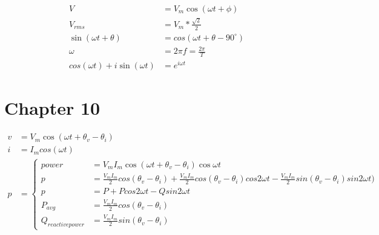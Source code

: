 \documentclass[a4paper,12]{article}
\begin{document}
\begin{align}
    V &=V_m\cos(\omega t+\phi)\\
    V_{rms} &=V_m*\frac{\sqrt{2}}{2}\\
    \sin(\omega t +\theta)&=cos(\omega t+\theta-90^\circ)\\
    \omega &= 2\pi f=\frac{2\pi}{T}\\
    cos(\omega t)+i \sin(\omega t) &=e^{i\omega t}
\end{align}

\cleardoublepage

\section{Chapter 10}
\begin{align*}
    v &=V_m \cos(\omega t +\theta_v-\theta _i)\\
    i &=I_m cos(\omega t)\\
    p &=\begin{cases}
     power &=V_mI_m \cos(\omega t+\theta_v -\theta _i)\cos \omega t\\
    p &=\frac{V_mI_m}{2}cos(\theta _v-\theta _i)+\frac{V_mI_m}{2}cos(\theta _v-\theta _i)cos2\omega t-\frac{V_m I_m}{2}sin(\theta_v-\theta _i)sin2\omega t)\\
    p &=P+Pcos2\omega t-Qsin2\omega t\\
    P_{avg} &=\frac{V_mI_m}{2}cos(\theta_v-\theta _i)\\
   Q_{reactive power} &=\frac{V_mI_m}{2}sin(\theta_v-\theta _i)
    \end{cases}
\end{align*}
\end{document}

